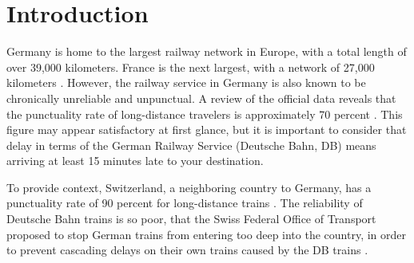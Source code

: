 \documentclass[12pt,a4paper]{article}
\title{\mytitle}
\author{Fabian Becker}
\date{\today}
\begin{document}
    
    
\maketitle

\begin{abstract}
  Although the German railway network is considered the largest in Europe, it is also infamous for being very unreliable. Given that 70 percent of long-distance trains are currently not punctual, the German government has introduced a railway spending programme with the objective of reducing delays and enhancing the attractiveness of rail travel. In order for the spending programme to be successful, it is necessary to identify the factors that cause delays. In this paper, several of these factors will be shown, retrieved from a linear regression analysis. The study revealed that specific train station operators and control centers exert an influence on train delay, both positively and negatively. These insights can be employed to identify optimal train organisation strategies and implement them across the entire railway network. Furthermore, this research can serve as a foundation for identifying other crucial influences through the utilisation of a larger data set containing more information.
\end{abstract}

\section{\label{sec:Introduction}Introduction}

Germany is home to the largest railway network in Europe, with a total length of over 39,000 kilometers. France is the next largest, with a network of 27,000 kilometers \citep[p.~80]{RailwayLengthStat}. 
However, the railway service in Germany is also known to be chronically unreliable and unpunctual. 
A review of the official data reveals that the punctuality rate of long-distance travelers is approximately 70 percent \citep{dpa2023, DBPunctuality2024}. 
This figure may appear satisfactory at first glance, but it is important to consider that delay in terms of the German Railway Service (Deutsche Bahn, DB) means arriving at least 15 minutes late to your destination.

To provide context, Switzerland, a neighboring country to Germany, has a punctuality rate of 90 percent for long-distance trains \citep{SBB2024}. 
The reliability of Deutsche Bahn trains is so poor, that the Swiss Federal Office of Transport proposed to stop German trains from entering too deep into the country, in order to prevent cascading delays on their own trains  caused by the DB trains \citep{Magill2023}.
\end{document}
